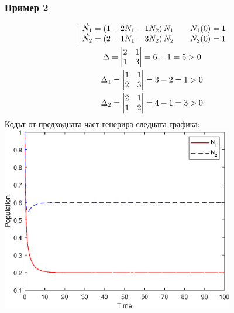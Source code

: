 \documentclass[a4paper,fleqn,12pt]{article}
\begin{document}
\subsubsection*{Пример 2}
\begin{gather*}
	\begin{array}{|l@{}}
	\dot{N_1} = \left(1 - 2N_1 - 1 N_2 \right) N_1 \qquad N_1(0) = 1\\
	\dot{N_2} = \left(2 - 1N_1 - 3 N_2 \right) N_2  \qquad N_2(0) = 1
	\end{array} \\
	\Delta = \begin{vmatrix} 2 & 1 \\ 1 & 3 \end{vmatrix} = 6 - 1 = 5 > 0 \\
	\Delta_1 = \begin{vmatrix}1 & 1 \\ 2 & 3 \end{vmatrix} = 3 - 2 = 1 > 0 \\
	\Delta_2 = \begin{vmatrix}2 & 1\\ 1 & 2 \end{vmatrix} = 4-1 = 3 > 0
\end{gather*}
Кодът от предходната част генерира следната графика: \\
\includegraphics [width=4in]{ecologyComp_02.eps}
\end{document}
